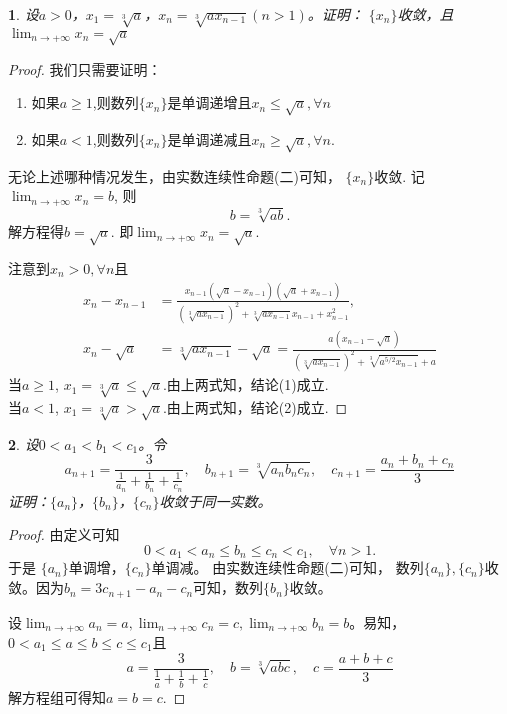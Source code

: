 \documentclass[utf8]{book}
\newtheorem{example}{}[section]             %
\begin{document}
\begin{example}
设$a> 0$，$x_1 = \sqrt[3]{a}$，$x_n=\sqrt[3]{ax_{n-1}}(n> 1)$。证明： $\{x_n\}$收敛，且$\displaystyle  \lim_{n\to +\infty}x_n=\sqrt{a}$
\end{example}
\begin{proof}
我们只需要证明：
\renewcommand\labelenumi{\normalfont(\theenumi)}
\begin{enumerate}
\item 如果$a\geq 1$,则数列$\{x_n\}$是单调递增且$x_n \leq \sqrt{a}, \forall n$
\item 如果$a<1$,则数列$\{x_n\}$是单调递减且$x_n\geq\sqrt{a},\forall n$.
\end{enumerate}
无论上述哪种情况发生，由实数连续性命题(二)可知， $\{x_n\}$收敛. 记$\displaystyle  \lim_{n\to +\infty}x_n=b$, 则
$$b=\sqrt[3]{ab}.$$
解方程得$b=\sqrt{a}$. 即$\displaystyle  \lim_{n\to +\infty}x_n=\sqrt{a}$.

注意到$x_n > 0, \forall n$且
\begin{equation*}
\begin{split}
x_n - x_{n-1} &= \displaystyle\frac{x_{n-1}(\sqrt{a}-x_{n-1})(\sqrt{a}+x_{n-1})}{\left(\sqrt[3]{ax_{n-1}}\right)^2 + \sqrt[3]{ax_{n-1}}x_{n-1}+x_{n-1}^2},\\
x_n - \sqrt{a} &=\sqrt[3]{ax_{n-1}}-\sqrt{a}=\frac{a(x_{n-1}-\sqrt{a})}{\left(\sqrt[3]{ax_{n-1}}\right)^2 + \sqrt[3]{a^{5/2}x_{n-1}}+a}
\end{split}
\end{equation*}
当$a\geq1$, $x_1 = \sqrt[3]{a} \leq \sqrt{a}$.由上两式知，结论(1)成立.\\
当$a < 1$, $x_1 = \sqrt[3]{a} > \sqrt{a}$.由上两式知，结论(2)成立.
\end{proof}
\begin{example}
设$0<a_1<b_1<c_1$。令
$$a_{n+1}=\frac{3}{\displaystyle\frac{1}{a_n}+\frac{1}{b_n}+\frac{1}{c_n}},\quad
b_{n+1} =  \displaystyle\sqrt[3]{a_nb_nc_n},\quad
c_{n+1}= \displaystyle\frac{a_n+b_n+c_n}{3}
$$
证明：$\{a_n\}$，$\{b_n\}$，$\{c_n\}$收敛于同一实数。
\end{example}
\begin{proof}
由定义可知$$0< a_1< a_n \leq b_n \leq c_n < c_1, \quad\forall n >1.$$
于是 $\{a_n\}$单调增，$\{c_n\}$单调减。
由实数连续性命题(二)可知， 数列$\{a_n\}, \{c_n\}$收敛。因为$b_n = 3c_{n+1} - a_n - c_n$可知，数列$\{b_n\}$收敛。

设$\displaystyle  \lim_{n\to +\infty}a_n=a, \displaystyle  \lim_{n\to +\infty}c_n=c, \displaystyle \lim_{n\to +\infty}b_n=b$。易知，$0<a_1 \leq a\leq b\leq c\leq c_1$且
\begin{equation*}
a = \frac{3}{\displaystyle\frac{1}{a}+\frac{1}{b}+\frac{1}{c}},\quad
b = \displaystyle\sqrt[3]{abc},\quad
c = \displaystyle\frac{a+b+c}{3}
\end{equation*}
解方程组可得知$a=b=c$.
\end{proof}
\end{document}
